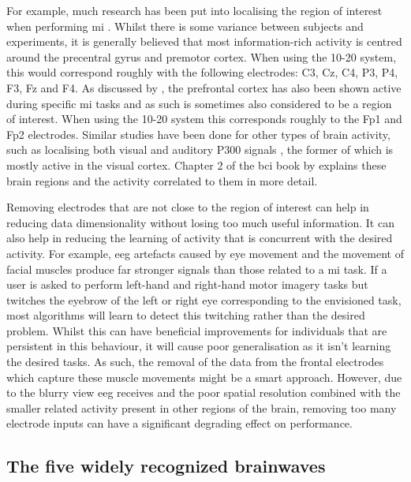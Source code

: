 For example, much research has been put into localising the region of interest when performing \gls{mi} \citep{mi_location1, mi_location2, mi_location3, mi_location4, mi_location5, mi_location6}.
Whilst there is some variance between subjects and experiments, it is generally believed that most information-rich activity is centred around the precentral gyrus and premotor cortex.
When using the 10-20 system, this would correspond roughly with the following electrodes: C3, Cz, C4, P3, P4, F3, Fz and F4.
As discussed by \citet{mi_location6}, the prefrontal cortex has also been shown active during specific \gls{mi} tasks and as such is sometimes also considered to be a region of interest.
When using the 10-20 system this corresponds roughly to the Fp1 and Fp2 electrodes.
Similar studies have been done for other types of brain activity, such as localising both visual and auditory P300 signals \citep{p300_location}, the former of which is mostly active in the visual cortex.
Chapter 2 of the \gls{bci} book by \citet{bci_book} explains these brain regions and the activity correlated to them in more detail.

Removing electrodes that are not close to the region of interest can help in reducing data dimensionality without losing too much useful information.
It can also help in reducing the learning of activity that is concurrent with the desired activity.
For example, \gls{eeg} artefacts caused by eye movement and the movement of facial muscles produce far stronger signals than those related to a \gls{mi} task.
If a user is asked to perform left-hand and right-hand motor imagery tasks but twitches the eyebrow of the left or right eye corresponding to the envisioned task, most algorithms will learn to detect this twitching rather than the desired problem.
Whilst this can have beneficial improvements for individuals that are persistent in this behaviour, it will cause poor generalisation as it isn't learning the desired tasks.
As such, the removal of the data from the frontal electrodes which capture these muscle movements might be a smart approach.
However, due to the blurry view \gls{eeg} receives and the poor spatial resolution combined with the smaller related activity present in other regions of the brain, removing too many electrode inputs can have a significant degrading effect on performance.



\subsection{The five widely recognized brainwaves}
\label{subsec:biomedical_signals_working_with_eeg_brain_waves}

